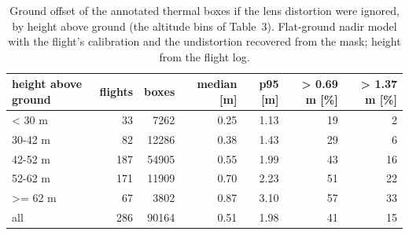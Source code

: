 \begin{table}[t]
\centering
\small
\caption{Ground offset of the annotated thermal boxes if the lens distortion were ignored, by height above ground (the altitude bins of Table~3). Flat-ground nadir model with the flight's calibration and the undistortion recovered from the mask; height from the flight log.}
\label{tab:distortion}
\begin{tabular}{lrrrrrr}
\toprule
height above ground & flights & boxes & median [m] & p95 [m] & > 0.69 m [\%] & > 1.37 m [\%] \\
\midrule
< 30 m & 33 & 7262 & 0.25 & 1.13 & 19 & 2 \\
30-42 m & 82 & 12286 & 0.38 & 1.43 & 29 & 6 \\
42-52 m & 187 & 54905 & 0.55 & 1.99 & 43 & 16 \\
52-62 m & 171 & 11909 & 0.70 & 2.23 & 51 & 22 \\
>= 62 m & 67 & 3802 & 0.87 & 3.10 & 57 & 33 \\
all & 286 & 90164 & 0.51 & 1.98 & 41 & 15 \\
\bottomrule
\end{tabular}
\end{table}
